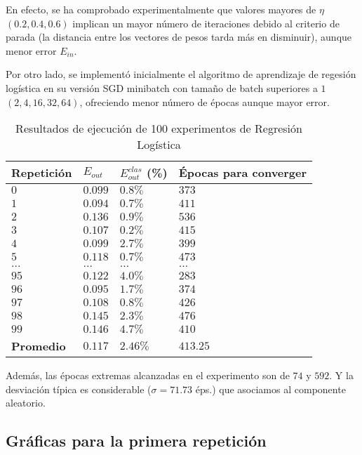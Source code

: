 En efecto, se ha comprobado experimentalmente que valores mayores de $\eta$
$(0.2, 0.4, 0.6)$ implican un mayor número de iteraciones debido al criterio de
parada (la distancia entre los vectores de pesos tarda más en disminuir), aunque
menor error $E_{in}$.

Por otro lado, se implementó inicialmente el algoritmo de aprendizaje de
regesión logística en su versión SGD minibatch con tamaño de batch superiores a $1$
$(2, 4, 16, 32, 64)$, ofreciendo menor número de épocas aunque mayor error.

\begin{table}[H]
    \centering
    \begin{tabular}{llll}
    \toprule
        Repetición & $E_{out}$ & $E_{out}^{clas}$ (\%) & Épocas para converger \\ \midrule
        $0$ & $0.099$ & $0.8 \%$ & $373$ \hfill \\
        $1$ & $0.094$ & $0.7 \%$ & $411$ \hfill\\
        $2$ & $0.136$ & $0.9 \%$ & $536$ \hfill \\
        $3$ & $0.107$ & $0.2 \%$ & $415$ \hfill \\
        $4$ & $0.099$ & $2.7 \%$ & $399$ \hfill \\
        $5$ & $0.118$ & $0.7 \%$ & $473$ \hfill \\
        $\dots$ & $\dots$ & $\dots$ & $\dots$ \hfill \\
        $95$ & $0.122$ & $4.0 \%$ & $283$ \hfill \\
        $96$ & $0.095$ & $1.7 \%$ & $374$ \hfill \\
        $97$ & $0.108$ & $0.8 \%$ & $426$ \hfill \\
        $98$ & $0.145$ & $2.3 \%$ & $476$ \hfill \\
        $99$ & $0.146$ & $4.7 \%$ & $410$ \hfill \\ \bottomrule
        \textbf{Promedio} & \textbf{$0.117$} & \textbf{$2.46 \%$} & \textbf{$413.25$} \\ \bottomrule
    \end{tabular}
    \caption{Resultados de ejecución de 100 experimentos de Regresión Logística}
\end{table}

Además, las épocas extremas alcanzadas en el experimento son de $74$ y $592$. Y
la desviación típica es considerable ($\sigma = 71.73$ éps.) que asociamos al componente
aleatorio.

\subsection{Gráficas para la primera repetición}

